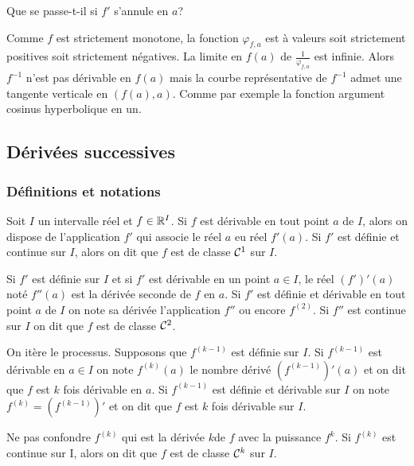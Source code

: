 Que se passe-t-il si \(f'\) s'annule en \(a\)?

Comme \(f\) est strictement monotone, la fonction \(\varphi_{f,a}\) est à 
valeurs soit strictement positives soit strictement négatives. La limite en 
\(f(a)\) de \(\frac{1}{\varphi_{f,a}}\) est infinie. Alors \(f^{-1}\) n'est pas 
dérivable en \(f(a)\) mais la courbe représentative de \(f^{-1}\) admet une 
tangente verticale en \((f(a),a)\). Comme par exemple la fonction argument 
cosinus hyperbolique en un.

\subsection{Dérivées successives}

\subsubsection{Définitions et notations}

Soit \(I\) un intervalle réel et \(f \in \mathbb{R}^I\). Si \(f\) est dérivable en tout 
point \(a\) de \(I\), alors on dispose de l'application \(f'\) qui associe le 
réel \(a\) eu réel \(f'(a)\). Si \(f'\) est définie et continue sur \(I\), alors 
on dit que \(f\) est de classe \(\mathcal{C}^{1}\) sur \(I\).

Si \(f'\) est définie sur \(I\) et si \(f'\) est dérivable en un point \(a \in 
I\), le réel \((f')'(a)\) noté \(f''(a)\) est la dérivée seconde de \(f\) en 
\(a\). Si \(f'\) est définie et dérivable en tout point \(a\) de \(I\) on note 
sa dérivée l'application \(f''\) ou encore \(f^{(2)}\). Si \(f''\) est continue 
sur \(I\) on dit que \(f\) est de classe \(\mathcal{C}^{2}\).

On itère le processus. Supposons que \(f^{(k-1)}\) est définie sur \(I\). Si 
\(f^{(k-1)}\) est dérivable en \(a \in I\) on note \(f^{(k)}(a)\) le nombre 
dérivé \((f^{(k-1)})'(a)\) et on dit que \(f\) est \(k\) fois dérivable en 
\(a\). Si \(f^{(k-1)}\) est définie et dérivable sur \(I\) on note \(f^{(k)} = 
(f^{(k-1)})'\) et on dit que \(f\) est \(k\) fois dérivable sur \(I\).

Ne pas confondre \(f^{(k)}\) qui est la dérivée \(k\)\ieme de \(f\) avec la 
puissance \(f^k\). Si \(f^{(k)}\) est continue sur I, alors on dit que \(f\) est 
de classe \(\mathcal{C}^{k}\) sur \(I\).

